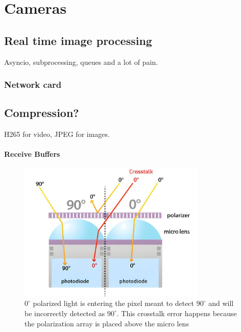 \chapter{Cameras}



\section{Real time image processing}
Asyncio, subprocessing, queues and a lot of pain.






\subsection*{Network card}


\section{Compression?}
H265 for video, JPEG for images.



\subsubsection{Receive Buffers}
\begin{figure}
    \centering
    \includegraphics[width=0.8\textwidth]{figures/crosstalk_upscaled.jpg}
    \caption{$0^{\circ}$ polarized light is entering the pixel meant to detect $90^{\circ}$ and will be incorrectly detected as $90^{\circ}$.  This crosstalk error happens because the polarization array is placed above the micro lens \cite{lucidvisionlabsPolarizationExplainedSony2018}}
    \label{fig:camera_crosstalk}
\end{figure}

